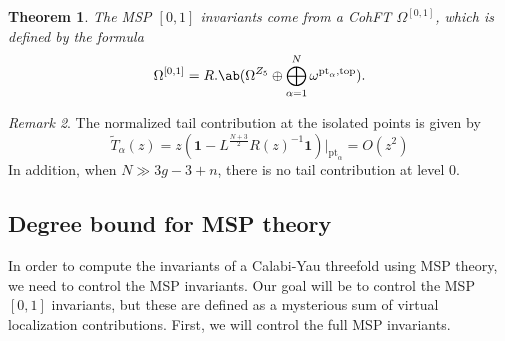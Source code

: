 \documentclass[10pt,oldfontcommands,oneside]{memoir}
\newtheorem{thm}{Theorem}[section]
\theoremstyle{definition}
\theoremstyle{remark}
\newtheorem{rmk}[thm]{Remark}
\theoremstyle{plain}
\theoremstyle{definition}
\theoremstyle{remark}
\newcommand{\mr}[1]{\mathrm{#1}}
\newcommand{\1}{\mathbf{1}}
\newcommand{\2}{\mathbf{2}}
\newcommand{\3}{\mathbf{3}}
\newcommand{\pt}{\mr{pt}}
\begin{document}
\begin{thm}
    The MSP $[0,1]$ invariants come from a CohFT $\Omega^{[0,1]}$, which is defined by the formula
    \[ \Omega^{[0,1]} = R . \ab(\Omega^{Z_5} \oplus \bigoplus_{\alpha=1}^N \omega^{\pt_{\alpha},\mr{top}}). \]
\end{thm}

\begin{rmk}
    The normalized tail contribution at the isolated points is given by
    \[ \tilde{T}_{\alpha}(z) = z (\1-L^{\frac{N+3}{2}} R(z)^{-1}\1) |_{\pt_{\alpha}} = O(z^2) \]
     In addition, when $N \gg 3g-3+n$, there is no tail contribution at level $0$.
\end{rmk}

\subsection{Degree bound for MSP theory}%
\label{sub:Degree bound for MSP theory}

In order to compute the invariants of a Calabi-Yau threefold using MSP theory, we need to control the MSP invariants. Our goal will be to control the MSP $[0,1]$ invariants, but these are defined as a mysterious sum of virtual localization contributions. First, we will control the full MSP invariants.
\end{document}
